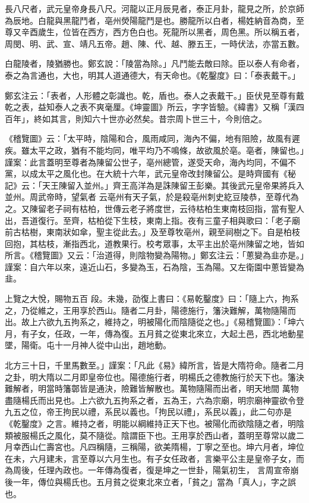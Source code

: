 \begin{pinyinscope}
 長八尺者，武元皇帝身長八尺。河龍以正月辰見者，泰正月卦，龍見之所，於京師為辰地。白龍與黑龍鬥者，亳州熒陽龍鬥是也。勝龍所以白者，楊姓納音為商，至尊又辛酉歲生，位皆在西方，西方色白也。死龍所以黑者，周色黑。所以稱五者，周閔、明、武、宣、靖凡五帝。趙、陳、代、越、滕五王，一時伏法，亦當五數。



 白龍陵者，陵猶勝也。鄭玄說：「陵當為除。」凡鬥能去敵曰除。臣以泰人有命者，泰之為言通也，大也，明其人道通德大，有天命也。《乾鑿度》曰：「泰表戴干。」



 鄭玄注云：「表者，人形體之彰識也。乾，盾也。泰人之表戴干。」臣伏見至尊有戴
 乾之表，益知泰人之表不爽毫厘。《坤靈圖》所云，字字皆驗。《緯書》又稱「漢四百年」，終如其言，則知六十世亦必然矣。昔宗周卜世三十，今則倍之。



 《稽覽圖》云：「太平時，陰陽和合，風雨咸同，海內不偏，地有阻險，故風有遲疾。雖太平之政，猶有不能均同，唯平均乃不鳴條，故欲風於亳。亳者，陳留也。」謹案：此言蓋明至尊者為陳留公世子，亳州總管，遂受天命，海內均同，不偏不黨，以成太平之風化也。在大統十六年，武元皇帝改封陳留公。是時齊國有《秘記》云：「天王陳留入並州。」齊王高洋為是誅陳留王彭樂。其後武元皇帝果將兵入並州。周武帝時，望氣者
 云亳州有天子氣，於是殺亳州刺史紇豆陵恭，至尊代為之。又陳留老子祠有枯柏，世傳云老子將度世，云待枯柏生東南枝回指，當有聖人出，吾道復行。至齊，枯柏從下生枝，東南上指。夜有三童子相與歌曰：「老子廟前古枯樹，東南狀如傘，聖主從此去。」及至尊牧亳州，親至祠樹之下。自是柏枝回抱，其枯枝，漸指西北，道教果行。校考眾事，太平主出於亳州陳留之地，皆如所言。《稽覽圖》又云：「治道得，則陰物變為陽物。」鄭玄注云：「蔥變為韭亦是。」謹案：自六年以來，遠近山石，多變為玉，石為陰，玉為陽。又左衛園中蔥皆變為韭。



 上覽之大悅，賜物五百
 段。未幾，劭復上書曰：《易乾鑿度》曰：「隨上六，拘系之，乃從維之，王用享於西山。隨者二月卦，陽德施行，籓決難解，萬物隨陽而出。故上六欲九五拘系之，維持之，明被陽化而陰隨從之也。」《易稽覽圖》：「坤六月，有子女，任政，一年，傳為復。五月貧之從東北來立，大起土邑，西北地動星墜，陽衛。屯十一月神人從中山出，趙地動。



 北方三十日，千里馬數至。」謹案：「凡此《易》緯所言，皆是大隋符命。隨者二月之卦，明大隋以二月即皇帝位也。陽德施行者，明楊氏之德教施行於天下也。籓決難解者，明當時籓鄣皆是通決，險難皆解散也。萬物隨陽而出者，明天地間
 萬物盡隨楊氏而出見也。上六欲九五拘系之者，五為王，六為宗廟，明宗廟神靈欲令登九五之位，帝王拘民以禮，系民以義也。「拘民以禮」，系民以義」，此二句亦是《乾鑿度》之言。維持之者，明能以綱維持正天下也。被陽化而欲陰隨之者，明陰類被服楊氏之風化，莫不隨從。陰謂臣下也。王用享於西山者，蓋明至尊常以歲二月幸西山仁壽宮也。凡四稱隨，三稱陽，欲美隋楊，丁寧之至也。坤六月者，坤位在未，六月建未，言至尊以六月生也。有子女任政者，言樂平公主是皇帝子女，而為周後，任理內政也。一年傳為復者，復是坤之一世卦，陽氣初生，
 言周宣帝崩後一年，傳位與楊氏也。五月貧之從東北來立者，「貧之」當為「真人」，字之誤也。




\end{pinyinscope}
